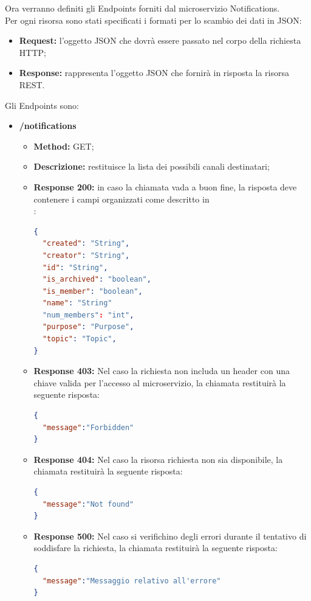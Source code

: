 Ora verranno definiti gli Endpoints forniti dal microservizio Notifications. \\
Per ogni risorsa sono stati specificati i formati per lo scambio dei dati in JSON:
\begin{itemize}
\item \textbf{Request:} l’oggetto JSON che dovrà essere passato nel corpo della richiesta HTTP;
\item \textbf{Response:} rappresenta l’oggetto JSON che fornirà in risposta la risorsa REST.
\end{itemize}
Gli Endpoints sono:
\begin{itemize}

\item \textbf{/notifications}\\
\begin{itemize}
\item \textbf{Method:} GET;
\item \textbf{Descrizione:} restituisce la lista dei possibili canali destinatari;
\item \textbf{Response 200:} in caso la chiamata vada a buon fine, la risposta deve contenere i campi organizzati come descritto in \\:
\begin{lstlisting}[language=json,firstnumber=1]
{
  "created": "String",
  "creator": "String",
  "id": "String",
  "is_archived": "boolean",
  "is_member": "boolean",
  "name": "String"
  "num_members": "int",
  "purpose": "Purpose",
  "topic": "Topic",
}
\end{lstlisting}
\item \textbf{Response 403:} Nel caso la richiesta non includa un header  con una chiave valida per l'accesso al microservizio, la chiamata restituirà la seguente risposta:
\begin{lstlisting}[language=json,firstnumber=1]
{
  "message":"Forbidden"
}
\end{lstlisting}
\item \textbf{Response 404:} Nel caso la risorsa richiesta non sia disponibile, la chiamata restituirà la seguente risposta:
\begin{lstlisting}[language=json,firstnumber=1]
{
  "message":"Not found"
}
\end{lstlisting}
\item \textbf{Response 500:} Nel caso si verifichino degli errori durante il tentativo di soddisfare la richiesta, la chiamata restituirà la seguente risposta:
\begin{lstlisting}[language=json,firstnumber=1]
{
  "message":"Messaggio relativo all'errore"
}
\end{lstlisting}
\end{itemize}


\end{itemize}
